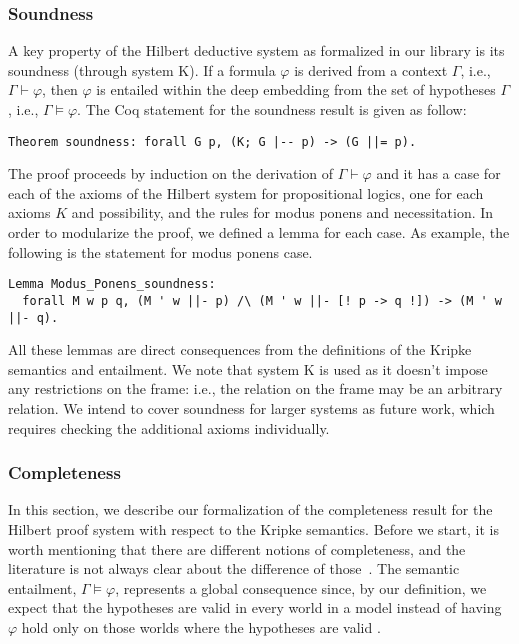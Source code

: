 \documentclass[3p,times]{elsarticle}
\begin{document}
\subsubsection{Soundness}\label{sec:soundness}

A key property of the Hilbert deductive system as formalized
in our library is its soundness (through system K). If a formula $\varphi$ is derived from a
context $\Gamma$, i.e., $\Gamma\vdash\varphi$, then $\varphi$ is entailed within the deep embedding
from the set of hypotheses $\Gamma$, i.e., $\Gamma\models\varphi$. The Coq statement for the soundness
result is given as follow:

\begin{verbatim}
Theorem soundness: forall G p, (K; G |-- p) -> (G ||= p).
\end{verbatim}

The proof proceeds by induction on the derivation of $\Gamma \vdash\varphi$ and
it has a case for each of the axioms of the Hilbert system for propositional
logics, one for each axioms $K$ and possibility, and the rules for modus
ponens and necessitation. In order to modularize the proof, we defined a lemma for each case.
As example, the following is the statement for modus ponens case.
\begin{verbatim}
Lemma Modus_Ponens_soundness:
  forall M w p q, (M ' w ||- p) /\ (M ' w ||- [! p -> q !]) -> (M ' w ||- q).
\end{verbatim}
All these lemmas are direct consequences from the definitions of the Kripke
semantics and entailment. We note that system K is used as it doesn't impose
any restrictions on the frame:
i.e., the relation on the frame may be an arbitrary relation.
We intend to cover soundness for larger systems as future work, which requires
checking the additional axioms individually.

\subsubsection{Completeness}\label{sec:completeness}

In this section, we describe our formalization of the completeness result for the
Hilbert proof system with respect to the Kripke semantics.
Before we start,
it is worth mentioning that there are different notions of completeness, and
the literature is not always clear about the difference of those~\cite{Popkorn_1994,modal_lean}.
The semantic entailment, $\Gamma\models\varphi$, represents a global consequence since, by our definition,
we expect that the hypotheses are valid in every world in a model instead
of having $\varphi$ hold only on those worlds where the hypotheses are valid \cite{de1999global}.
\end{document}
